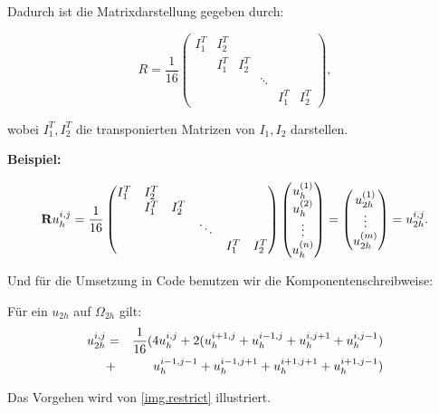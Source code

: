 Dadurch ist die Matrixdarstellung gegeben durch:

\begin{equation}
R = \frac{1}{16}
\begin{pmatrix}
I_{1}^{T} & I_{2}^{T}\\
		  & I_{1}^{T} & I_{2}^{T}\\
		  &			  &			  & \ddots\\
		  &			  &			  &		   & I_{1}^{T} & I_{2}^{T}
\end{pmatrix},
\end{equation}

wobei $I_{1}^{T}, I_{2}^{T}$ die transponierten Matrizen von $I_{1}, I_{2}$ darstellen.

\textbf{Beispiel:}

\begin{equation}
{\textbf{R}}u^{i,j}_{h} = \frac {1} {16}
\begin{pmatrix}
I_{1}^{T} & I_{2}^{T}\\
		  & I_{1}^{T} & I_{2}^{T}\\
		  &			  &			  & \ddots\\
		  &			  &			  &		   & I_{1}^{T} & I_{2}^{T}
\end{pmatrix}
\begin{pmatrix}
u_{h}^{(1)} \\
u_{h}^{(2)} \\
\vdots \\
u_{h}^{(n)}
\end{pmatrix} =
\begin{pmatrix}
u_{2h}^{(1)} \\
\vdots \\
u_{2h}^{(m)}
\end{pmatrix} =
u^{i,j}_{2h}.
\end{equation}

Und für die Umsetzung in Code benutzen wir die Komponentenschreibweise:

Für ein $u_{2h}$ auf $\Omega_{2h}$ gilt:
\begin{eqnarray}
u_{2h}^{i,j} &=& \frac {1} {16} (4u_{h}^{i,j}+2(u_{h}^{i+1,j}+u_{h}^{i-1,j}+u_{h}^{i,j+1}+u_{h}^{i,j-1})\notag \\
&+& u_{h}^{i-1,j-1}+u_{h}^{i-1,j+1}+u_{h}^{i+1,j+1}+u_{h}^{i+1,j-1})
\end{eqnarray}

Das Vorgehen wird von \autoref{img.restrict} illustriert.

\label{img.restrict}

